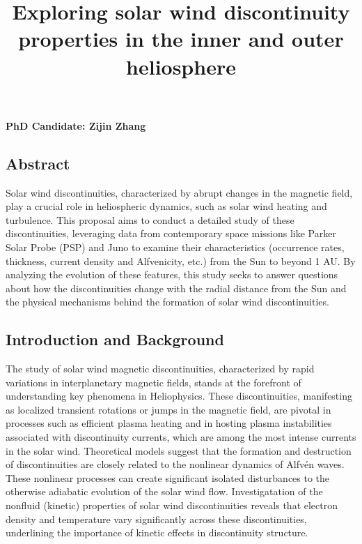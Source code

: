 \documentclass[
  letterpaper,
  DIV=11,
  numbers=noendperiod]{scrartcl}
\title{Exploring solar wind discontinuity properties in the inner and outer heliosphere}
\author{}
\date{}
\begin{document}
\maketitle

\vspace{-20truemm}


\textbf{PhD Candidate: Zijin Zhang}

\subsection{Abstract}\label{abstract}

Solar wind discontinuities, characterized by abrupt changes in the magnetic field, play a crucial role in heliospheric dynamics, such as solar wind heating and turbulence. This proposal aims to conduct a detailed study of these discontinuities, leveraging data from contemporary space missions like Parker Solar Probe (PSP) and Juno to examine their characteristics (occurrence rates, thickness, current density and Alfvenicity, etc.) from the Sun to beyond 1 AU. By analyzing the evolution of these features, this study seeks to answer questions about how the discontinuities change with the radial distance from the Sun and the physical mechanisms behind the formation of solar wind discontinuities.

\subsection{Introduction and Background}\label{introduction-and-background}

The study of solar wind magnetic discontinuities, characterized by rapid variations in interplanetary magnetic fields, stands at the forefront of understanding key phenomena in Heliophysics. These discontinuities, manifesting as localized transient rotations or jumps in the magnetic field, are pivotal in processes such as efficient plasma heating and in hosting plasma instabilities associated with discontinuity currents, which are among the most intense currents in the solar wind. Theoretical models suggest that the formation and destruction of discontinuities are closely related to the nonlinear dynamics of Alfvén waves. These nonlinear processes can create significant isolated disturbances to the otherwise adiabatic evolution of the solar wind flow. Investigatation of the nonfluid (kinetic) properties of solar wind discontinuities reveals that electron density and temperature vary significantly across these discontinuities, underlining the importance of kinetic effects in discontinuity structure.
\end{document}
